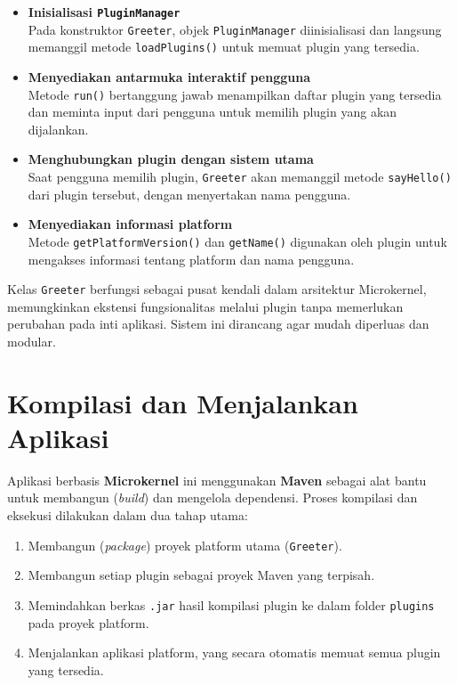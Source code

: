 \begin{itemize}
	\item \textbf{Inisialisasi \texttt{PluginManager}} \\
	Pada konstruktor \texttt{Greeter}, objek \texttt{PluginManager} diinisialisasi dan langsung memanggil metode \texttt{loadPlugins()} untuk memuat plugin yang tersedia.
	
	\item \textbf{Menyediakan antarmuka interaktif pengguna} \\
	Metode \texttt{run()} bertanggung jawab menampilkan daftar plugin yang tersedia dan meminta input dari pengguna untuk memilih plugin yang akan dijalankan.
	
	\item \textbf{Menghubungkan plugin dengan sistem utama} \\
	Saat pengguna memilih plugin, \texttt{Greeter} akan memanggil metode \texttt{sayHello()} dari plugin tersebut, dengan menyertakan nama pengguna.
	
	\item \textbf{Menyediakan informasi platform} \\
	Metode \texttt{getPlatformVersion()} dan \texttt{getName()} digunakan oleh plugin untuk mengakses informasi tentang platform dan nama pengguna.
\end{itemize}

Kelas \texttt{Greeter} berfungsi sebagai pusat kendali dalam arsitektur Microkernel, memungkinkan ekstensi fungsionalitas melalui plugin tanpa memerlukan perubahan pada inti aplikasi. Sistem ini dirancang agar mudah diperluas dan modular.


\section{Kompilasi dan Menjalankan Aplikasi}

Aplikasi berbasis \textbf{Microkernel} ini menggunakan \textbf{Maven} sebagai alat bantu untuk membangun (\textit{build}) dan mengelola dependensi. Proses kompilasi dan eksekusi dilakukan dalam dua tahap utama:

\begin{enumerate}
	\item Membangun (\textit{package}) proyek platform utama (\texttt{Greeter}).
	\item Membangun setiap plugin sebagai proyek Maven yang terpisah.
	\item Memindahkan berkas \texttt{.jar} hasil kompilasi plugin ke dalam folder \texttt{plugins} pada proyek platform.
	\item Menjalankan aplikasi platform, yang secara otomatis memuat semua plugin yang tersedia.
\end{enumerate}

